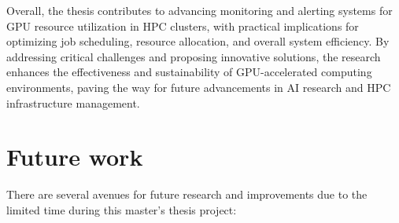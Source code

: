 Overall, the thesis contributes to advancing monitoring and alerting systems for GPU resource utilization in HPC clusters, with practical implications for optimizing job scheduling, resource allocation, and overall system efficiency. By addressing critical challenges and proposing innovative solutions, the research enhances the effectiveness and sustainability of GPU-accelerated computing environments, paving the way for future advancements in AI research and HPC infrastructure management.

\section{Future work}
There are several avenues for future research and improvements due to the limited time during this master's thesis project:

